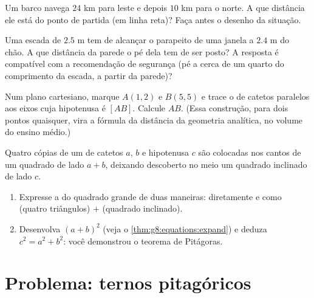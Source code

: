 \begin{exercise}[$\star\star$]\label{exo:g8:pythagoras:8}
Um barco navega $24$ km para leste e depois $10$ km para o norte. A que
distância ele está do ponto de partida (em linha reta)? Faça antes o
desenho da situação.
\end{exercise}

\begin{exercise}[$\star\star$]\label{exo:g8:pythagoras:9}
Uma escada de $2.5$ m tem de alcançar o parapeito de uma janela a
$2.4$ m do chão. A que distância da parede o pé dela tem de ser posto?
A resposta é compatível com a recomendação de segurança (pé a cerca de
um quarto do comprimento da escada, a partir da parede)?
\end{exercise}

\begin{exercise}[$\star\star$]\label{exo:g8:pythagoras:10}
Num plano cartesiano, marque $A(1, 2)$ e $B(5, 5)$ e trace o  de catetos paralelos aos eixos cuja hipotenusa é $[AB]$.
Calcule $AB$. (Essa construção, para dois pontos quaisquer, vira a
fórmula da distância da geometria analítica, no volume do ensino
médio.)
\end{exercise}

\begin{exercise}[$\star\star\star$]\label{exo:g8:pythagoras:11}
Quatro cópias de um  de catetos $a$, $b$ e
hipotenusa $c$ são colocadas nos cantos de um quadrado de lado
$a + b$, deixando descoberto no meio um quadrado inclinado de lado
$c$.
\begin{enumerate}
  \item Expresse a  do quadrado grande de duas maneiras:
        diretamente e como (quatro triângulos) $+$ (quadrado
        inclinado).
  \item Desenvolva $(a + b)^2$ (veja o \cref{thm:g8:equations:expand})
        e deduza $c^2 = a^2 + b^2$: você demonstrou o teorema de
        Pitágoras.
\end{enumerate}
\end{exercise}

\section{Problema: ternos pitagóricos}

